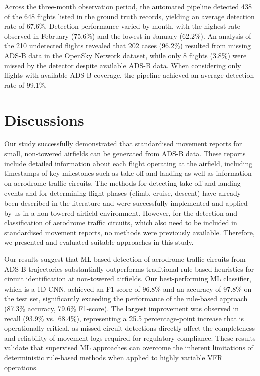 \documentclass[
  manuscript=proceedings,  %
  layout=preprint,         %
  year=2025,
  volume=x,
]{extra/joas}
\begin{document}
Across the three-month observation period, the automated pipeline detected 438 of the 648 flights listed in the ground truth records, yielding an average detection rate of 67.6\%. Detection performance varied by month, with the highest rate observed in February (75.6\%) and the lowest in January (62.2\%). An analysis of the 210 undetected flights revealed that 202 cases (96.2\%) resulted from missing ADS-B data in the OpenSky Network dataset, while only 8 flights (3.8\%) were missed by the detector despite available ADS-B data. When considering only flights with available ADS-B coverage, the pipeline achieved an average detection rate of 99.1\%. 


\section{Discussions}
\label{sec:discussion}
Our study successfully demonstrated that standardised movement reports for small, non-towered airfields can be generated from ADS-B data. These reports include detailed information about each flight operating at the airfield, including timestamps of key milestones such as take-off and landing as well as information on aerodrome traffic circuits. The methods for detecting take-off and landing events and for determining flight phases (climb, cruise, descent) have already been described in the literature and were successfully implemented and applied by us in a non-towered airfield environment. However, for the detection and classification of aerodrome traffic circuits, which also need to be included in standardised movement reports, no methods were previously available. Therefore, we presented and evaluated suitable approaches in this study.

Our results suggest that ML-based detection of aerodrome traffic circuits from ADS-B trajectories substantially outperforms traditional rule-based heuristics for circuit identification at non-towered airfields. Our best-performing ML classifier, which is a 1D CNN, achieved an F1-score of 96.8\% and an accuracy of 97.8\% on the test set, significantly exceeding the performance of the rule-based approach (87.3\% accuracy, 79.6\% F1-score). The largest improvement was observed in recall (93.9\% vs.\ 68.4\%), representing a 25.5 percentage-point increase that is operationally critical, as missed circuit detections directly affect the completeness and reliability of movement logs required for regulatory compliance. These results validate that supervised ML approaches can overcome the inherent limitations of deterministic rule-based methods when applied to highly variable VFR operations.
\end{document}
